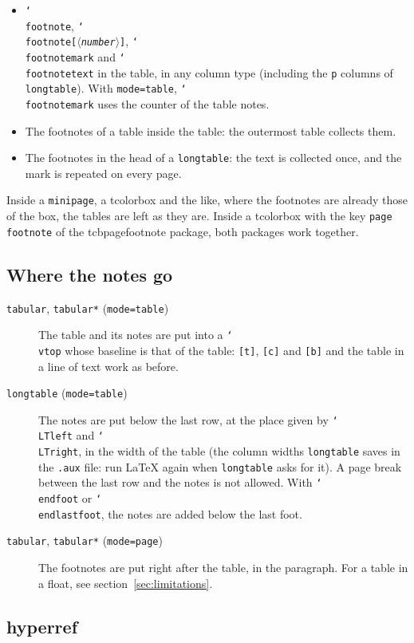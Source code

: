 \documentclass{article}
\newcommand*\cs[1]{\texttt{\char`\\#1}}
\newcommand*\pkg[1]{\textsf{#1}}
\newcommand*\key[1]{\texttt{#1}}
\newcommand*\meta[1]{$\langle$\textit{#1}$\rangle$}
\begin{document}
\begin{itemize}
\item \cs{footnote}, \cs{footnote}\texttt{[\meta{number}]},
  \cs{footnotemark} and \cs{footnotetext} in the table, in any column
  type (including the \texttt{p} columns of \texttt{longtable}).  With
  \key{mode=table}, \cs{footnotemark} uses the counter of the table
  notes.
\item The footnotes of a table inside the table: the outermost table
  collects them.
\item The footnotes in the head of a \texttt{longtable}: the text is
  collected once, and the mark is repeated on every page.
\end{itemize}
Inside a \texttt{minipage}, a \pkg{tcolorbox} and the like, where the
footnotes are already those of the box, the tables are left as they
are.  Inside a \pkg{tcolorbox} with the key \key{page footnote} of the
\pkg{tcbpagefootnote} package, both packages work together.

\subsection{Where the notes go}

\begin{description}
\item[\texttt{tabular}, \texttt{tabular*} (\key{mode=table})] The table
  and its notes are put into a \cs{vtop} whose baseline is that of the
  table: \texttt{[t]}, \texttt{[c]} and \texttt{[b]} and the table in a
  line of text work as before.
\item[\texttt{longtable} (\key{mode=table})] The notes are put below
  the last row, at the place given by \cs{LTleft} and \cs{LTright}, in
  the width of the table (the column widths \texttt{longtable} saves in
  the \texttt{.aux} file: run \LaTeX{} again when \texttt{longtable}
  asks for it).  A page break between the last row and the notes is
  not allowed.  With \cs{endfoot} or \cs{endlastfoot}, the notes are
  added below the last foot.
\item[\texttt{tabular}, \texttt{tabular*} (\key{mode=page})] The
  footnotes are put right after the table, in the paragraph.  For a
  table in a float, see section~\ref{sec:limitations}.
\end{description}

\subsection{hyperref}
\end{document}
